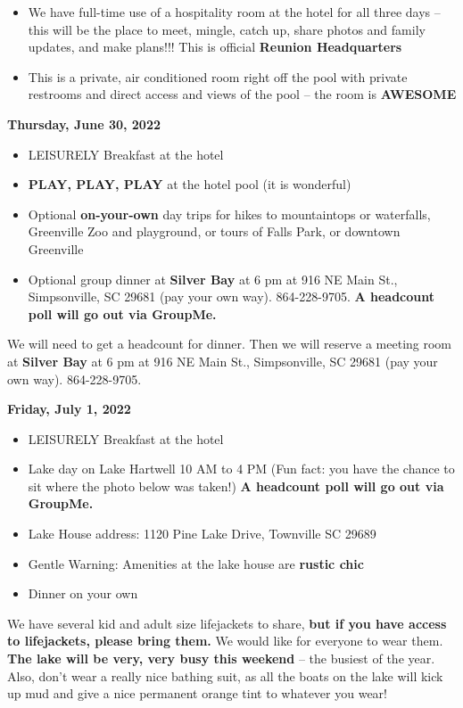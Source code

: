 \documentclass[
]{book}
\providecommand{\tightlist}{%
  \setlength{\itemsep}{0pt}\setlength{\parskip}{0pt}}
\begin{document}
\begin{itemize}
\tightlist
\item
  We have full-time use of a hospitality room at the hotel for all three days -- this will be the place to meet, mingle, catch up, share photos and family updates, and make plans!!! This is official \textbf{Reunion Headquarters}
\item
  This is a private, air conditioned room right off the pool with private restrooms and direct access and views of the pool -- the room is \textbf{AWESOME}
\end{itemize}

\textbf{Thursday, June 30, 2022}

\begin{itemize}
\tightlist
\item
  LEISURELY Breakfast at the hotel
\item
  \textbf{PLAY, PLAY, PLAY} at the hotel pool (it is wonderful)
\item
  Optional \textbf{on-your-own} day trips for hikes to mountaintops or waterfalls, Greenville Zoo and playground, or tours of Falls Park, or downtown Greenville
\item
  Optional group dinner at \textbf{Silver Bay} at 6 pm at 916 NE Main St., Simpsonville, SC 29681 (pay your own way). 864-228-9705. \textbf{A headcount poll will go out via GroupMe.}
\end{itemize}

We will need to get a headcount for dinner. Then we will reserve a meeting room at \textbf{Silver Bay} at 6 pm at 916 NE Main St., Simpsonville, SC 29681 (pay your own way). 864-228-9705.

\textbf{Friday, July 1, 2022}

\begin{itemize}
\tightlist
\item
  LEISURELY Breakfast at the hotel
\item
  Lake day on Lake Hartwell 10 AM to 4 PM (Fun fact: you have the chance to sit where the photo below was taken!) \textbf{A headcount poll will go out via GroupMe.}
\item
  Lake House address: 1120 Pine Lake Drive, Townville SC 29689
\item
  Gentle Warning: Amenities at the lake house are \textbf{rustic chic}
\item
  Dinner on your own
\end{itemize}

We have several kid and adult size lifejackets to share, \textbf{but if you have access to lifejackets, please bring them.} We would like for everyone to wear them. \textbf{The lake will be very, very busy this weekend} -- the busiest of the year. Also, don't wear a really nice bathing suit, as all the boats on the lake will kick up mud and give a nice permanent orange tint to whatever you wear!
\end{document}
